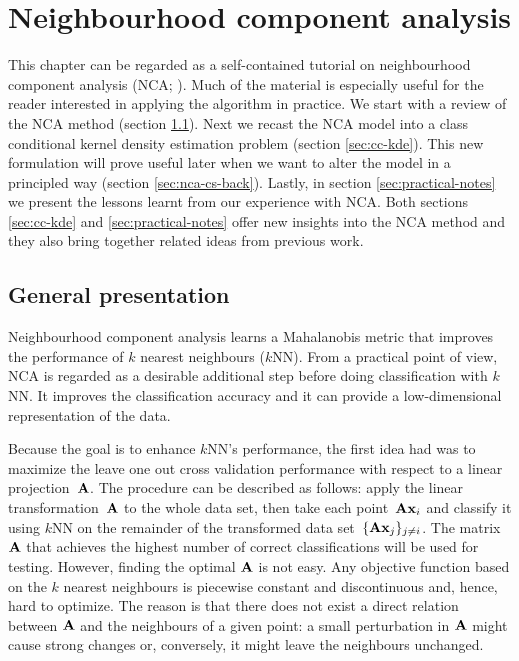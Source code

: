 \chapter{Neighbourhood component analysis}
\label{ch:nca}
	This chapter can be regarded as a self-contained tutorial on neighbourhood component analysis (NCA; \citealp{goldberger2004}). Much of the material is especially useful for the reader interested in applying the algorithm in practice. We start with a review of the NCA method (section \ref{sec:general-presentation}). Next we recast the NCA model into a class conditional kernel density estimation problem (section \ref{sec:cc-kde}). This new formulation will prove useful later when we want to alter the model in a principled way (section \ref{sec:nca-cs-back}). Lastly, in section \ref{sec:practical-notes} we present the lessons learnt from our experience with NCA. Both sections \ref{sec:cc-kde} and \ref{sec:practical-notes} offer new insights into the NCA method and they also bring together related ideas from previous work.

\section{General presentation}
\label{sec:general-presentation}
	Neighbourhood component analysis learns a Mahalanobis metric that improves the performance of $k$ nearest neighbours ($k$NN). From a practical point of view, NCA  is regarded as a desirable additional step before doing classification with $k$NN. It improves the classification accuracy and it can provide a low-dimensional representation of the data.

	Because the goal is to enhance $k$NN's performance, the first idea \citet{goldberger2004}
	had was to maximize the leave one out cross validation performance with respect to a linear projection~$\mathbf{A}$. The procedure can be described as follows: apply the linear transformation~$\mathbf{A}$ to the whole data set, then take each 
	point~$\mathbf{A}\mathbf{x}_i$ and classify it using $k$NN on the remainder of the transformed data set~$\{\mathbf{A}\mathbf{x}_j\}_{j\neq i}$. The matrix~$\mathbf{A}$ that achieves the highest number of correct classifications will be used for testing. However, finding the optimal $\mathbf{A}$ is not easy. Any objective function based on the $k$ nearest neighbours
	is piecewise constant and discontinuous and, hence, hard to optimize. The reason is that there does
	not exist a direct relation between $\mathbf{A}$ and the neighbours
	of a given point: a small perturbation in $\mathbf{A}$ might cause strong changes or, conversely, 
	it might leave the neighbours unchanged.
	
